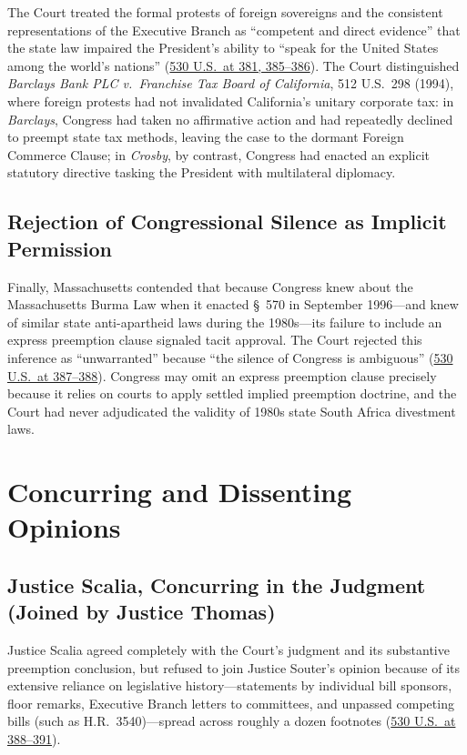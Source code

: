 \documentclass[12pt]{article}
\begin{document}
The Court treated the formal protests of foreign sovereigns and the consistent representations of the Executive Branch as ``competent and direct evidence'' that the state law impaired the President's ability to ``speak for the United States among the world's nations'' (\href{https://www.law.cornell.edu/supct/html/99-474.ZS.html}{530 U.S.\ at 381, 385--386}). The Court distinguished \textit{Barclays Bank PLC v.\ Franchise Tax Board of California}, 512 U.S.\ 298 (1994), where foreign protests had not invalidated California's unitary corporate tax: in \textit{Barclays}, Congress had taken no affirmative action and had repeatedly declined to preempt state tax methods, leaving the case to the dormant Foreign Commerce Clause; in \textit{Crosby}, by contrast, Congress had enacted an explicit statutory directive tasking the President with multilateral diplomacy.

\subsection{Rejection of Congressional Silence as Implicit Permission}
Finally, Massachusetts contended that because Congress knew about the Massachusetts Burma Law when it enacted \S~570 in September 1996---and knew of similar state anti-apartheid laws during the 1980s---its failure to include an express preemption clause signaled tacit approval. The Court rejected this inference as ``unwarranted'' because ``the silence of Congress is ambiguous'' (\href{https://www.law.cornell.edu/supct/html/99-474.ZO.html}{530 U.S.\ at 387--388}). Congress may omit an express preemption clause precisely because it relies on courts to apply settled implied preemption doctrine, and the Court had never adjudicated the validity of 1980s state South Africa divestment laws.

\section{Concurring and Dissenting Opinions}

\subsection{Justice Scalia, Concurring in the Judgment (Joined by Justice Thomas)}
Justice Scalia agreed completely with the Court's judgment and its substantive preemption conclusion, but refused to join Justice Souter's opinion because of its extensive reliance on legislative history---statements by individual bill sponsors, floor remarks, Executive Branch letters to committees, and unpassed competing bills (such as H.R.\ 3540)---spread across roughly a dozen footnotes (\href{https://www.law.cornell.edu/supct/html/99-474.ZC.html}{530 U.S.\ at 388--391}).
\end{document}
